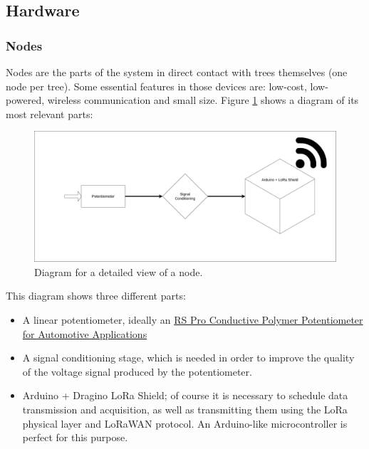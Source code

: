 \documentclass[11pt,a4paper,dvipsnames,twoside]{article}
\begin{document}
\subsection{Hardware}

\subsubsection{Nodes}
Nodes are the parts of the system in direct contact with trees themselves (one node per tree). Some essential features in those devices are: low-cost, low-powered, wireless communication and small size. Figure \ref{fig:NodeDiag} shows a diagram of its most relevant parts:

\begin{figure}[htp]
  \centering
  \includegraphics[width=.9\textwidth]{../schemes/node_tbg.png}
  \caption{Diagram for a detailed view of a node.}
  \label{fig:NodeDiag}
\end{figure}

This diagram shows three different parts:

\begin{itemize}
  \item A linear potentiometer, ideally an \href{https://docs.rs-online.com/37bf/0900766b814f0bd0.pdf}{RS Pro Conductive Polymer
  Potentiometer for Automotive Applications}%
  \item A signal conditioning stage, which is needed in order to improve the quality of the voltage signal produced by the potentiometer.
  \item Arduino + Dragino LoRa Shield; of course it is necessary to schedule data transmission and acquisition, as well as transmitting them using the LoRa physical layer and LoRaWAN protocol. An Arduino-like microcontroller is perfect for this purpose.
\end{itemize}
\end{document}
